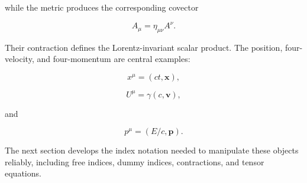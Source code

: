 while the metric produces the corresponding covector

\[
A_{\mu}
=
\eta_{\mu\nu}A^{\nu}.
\]

Their contraction defines the Lorentz-invariant scalar product. The position, four-velocity, and four-momentum are central examples:

\[
x^{\mu}=(ct,\mathbf{x}),
\]

\[
U^{\mu}=\gamma(c,\mathbf{v}),
\]

and

\[
p^{\mu}=(E/c,\mathbf{p}).
\]

The next section develops the index notation needed to manipulate these objects reliably, including free indices, dummy indices, contractions, and tensor equations.
